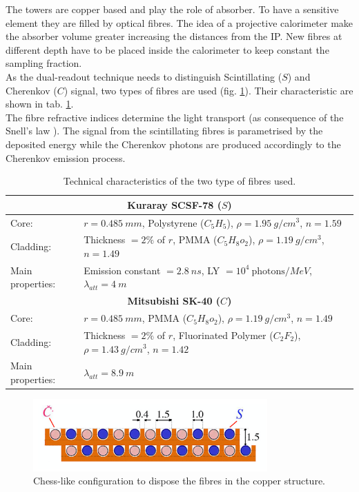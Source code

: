 The towers are copper based and play the role of absorber. To have a sensitive element they are filled by optical fibres. The idea of a projective calorimeter make the absorber volume greater increasing the distances from the IP. New fibres at different depth have to be placed inside the calorimeter to keep constant the sampling fraction.\\
As the dual-readout technique needs to distinguish Scintillating ($S$) and Cherenkov ($C$) signal, two types of fibres are used (fig. \ref{fig:CS_fibres}). Their characteristic are shown in tab. \ref{tab:fibres}.\\
The fibre refractive indices determine the light transport (as consequence of the Snell's law \cite{Snell}). The signal from the scintillating fibres is parametrised by the deposited energy while the Cherenkov photons are produced accordingly to the Cherenkov emission process.\\

\begin{table}
	\centering
	\setlength{\tabcolsep}{12pt}
	\begin{tabular}{lp{}}
		\toprule
		\multicolumn{2}{c}{\textbf{Kuraray SCSF-78 ($S$)}}	\\
		\midrule
		Core:				& $r = 0.485\ mm$, Polystyrene ($C_5H_5$), $\rho=1.95\ g/cm^3$, $n = 1.59$	\\
		Cladding: 			& Thickness $=2\%$ of $r$, PMMA ($C_5H_8o_2$), $\rho=1.19\ g/cm^3$, $n=1.49$	\\
		Main properties:	& Emission constant $= 2.8\ ns$, LY $= 10^4\ \text{photons}/MeV$, $\lambda_{att} = 4\ m$	\\
		\midrule
		\multicolumn{2}{c}{\textbf{Mitsubishi SK-40 ($C$)}}	\\
		\midrule
		Core:				& $r = 0.485\ mm$, PMMA ($C_5H_8o_2$), $\rho=1.19\ g/cm^3$, $n = 1.49$	\\
		Cladding: 			& Thickness $=2\%$ of $r$, Fluorinated Polymer ($C_2F_2$), $\rho=1.43\ g/cm^3$, $n=1.42$	\\
		Main properties:	& $\lambda_{att} = 8.9\ m$	\\
		\bottomrule
	\end{tabular}
	\caption{Technical characteristics of the two type of fibres used.}
	\label{tab:fibres}
\end{table}

\begin{figure}
	\centering
	\includegraphics[width=0.8\textwidth]{IMG/DRCGeometry2}
	\caption{Chess-like configuration to dispose the fibres in the copper structure.}
	\label{fig:CS_fibres}
\end{figure}

